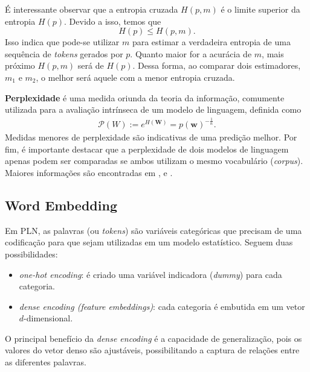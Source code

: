 \documentclass{automatextcc}
\newcommand{\Perp}{\mathcal{P}}
\newcommand{\bs}[1]{\boldsymbol{#1}}
\begin{document}
É interessante observar que a entropia cruzada $H(p,m)$ é o limite superior da entropia $H(p)$. Devido a isso, temos que
\begin{equation*}
    H(p) \leq H(p,m).
\end{equation*}
Isso indica que pode-se utilizar $m$ para estimar a verdadeira entropia de uma sequência de \textit{tokens} gerados por $p$. Quanto maior for a acurácia de $m$, mais próximo $H(p,m)$ será de $H(p)$. Dessa forma, ao comparar dois estimadores, $m_1$ e $m_2$, o melhor será aquele com a menor entropia cruzada.

\textbf{Perplexidade} é uma medida oriunda da teoria da informação, comumente utilizada para a avaliação intrínseca de um modelo de linguagem, definida como
\begin{align*}
    \Perp (W) := e^{H(\bs{W})} = p(\bs{w})^{-\frac{1}{n}}.
\end{align*}
Medidas menores de perplexidade são indicativas de uma predição melhor. Por fim, é importante destacar que a perplexidade de dois modelos de linguagem apenas podem ser comparadas se ambos utilizam o mesmo vocabulário (\textit{corpus}). Maiores informações são encontradas em \citet{manning1999}, \citet{kamath2019} e \citet{jurafsky2021}.



\subsection{Word Embedding}
Em PLN, as palavras (ou \textit{tokens}) são variáveis categóricas que precisam de uma codificação para que sejam utilizadas em um modelo estatístico. Seguem duas possibilidades:
\begin{itemize}
    \item \textit{one-hot encoding}: é criado uma variável indicadora (\textit{dummy}) para cada categoria.
    \item \textit{dense encoding (feature embeddings)}: cada categoria é embutida em um vetor $d$-dimensional.
\end{itemize}
O principal benefício da \textit{dense encoding} é a capacidade de generalização, pois os valores do vetor denso são ajustáveis, possibilitando a captura de relações entre as diferentes palavras.
\end{document}
